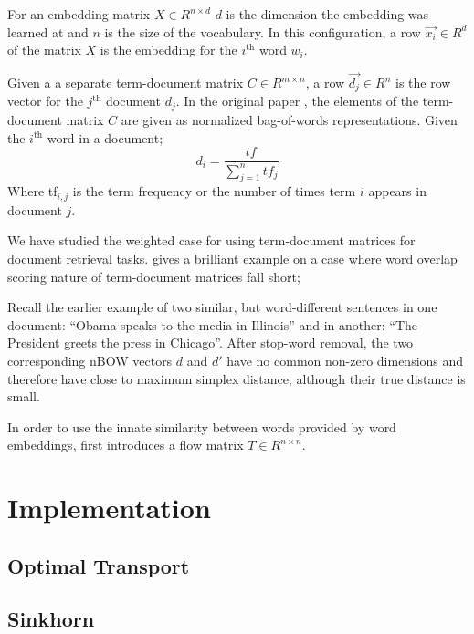 For an embedding matrix $X \in R^{n \times d}$ $d$ is the dimension the embedding was learned at and $n$ is the size of the vocabulary.
In this configuration, a row $\vec{x_i} \in R^d$ of the matrix $X$ is the embedding for the $i^{\text{th}}$ word $w_i$.

Given a a separate term-document matrix $C \in R^{m \times n}$, a row $\vec{d_j} \in R^n$ is the row vector for the $j^{\text{th}}$ document $d_j$.
In the original paper , the elements of the term-document matrix $C$ are given as normalized bag-of-words representations.
Given the $i^{\text{th}}$ word in a document;
\begin{equation}
    d_i = \frac{tf_{}}{\sum_{j = 1}^{n}tf_{j}}
\end{equation}
Where tf$_{i,j}$ is the term frequency or the number of times term $i$ appears in document $j$.

We have studied the \tfidf{} weighted case for using term-document matrices for document retrieval tasks.
\citeauthor{kusner_word_2015} gives a brilliant example on a case where word overlap scoring nature of term-document matrices fall short;
\begin{displayquote}
    Recall the earlier example of two similar, but word-different sentences in one document: \enquote{Obama speaks to the media in Illinois} and in another: \enquote{The President greets the press in Chicago}. After stop-word removal, the two corresponding nBOW vectors \textbf{$d$} and \textbf{$d'$} have no common non-zero dimensions and therefore have close to maximum simplex distance, although their true distance is small.
\end{displayquote}
In order to use the innate similarity between words provided by word embeddings, \citeauthor{kusner_word_2015} first introduces a flow matrix $T \in R^{n \times n}$.

\section{\citeauthor{balikas_cross-lingual_2018} Implementation}%
\label{sec:balikas_cross-lingual_2018_implementation}



\subsection{Optimal Transport}%
\label{sub:optimal_transport}

\subsection{Sinkhorn}%
\label{sub:sinkhorn}
